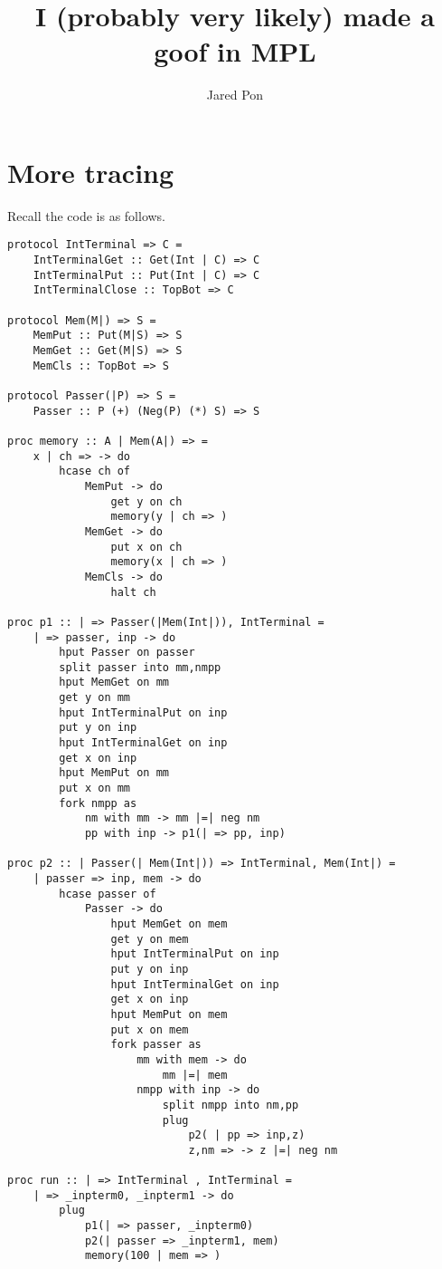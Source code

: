 \documentclass{article}
\title{I (probably very likely) made a goof in MPL}
\author{Jared Pon}
\theoremstyle{plain}%
\theoremstyle{definition}
\theoremstyle{remark}
\begin{document}
\maketitle 
\section{More tracing}
Recall the code is as follows.
\begin{verbatim}
protocol IntTerminal => C =
    IntTerminalGet :: Get(Int | C) => C
    IntTerminalPut :: Put(Int | C) => C
    IntTerminalClose :: TopBot => C

protocol Mem(M|) => S =
    MemPut :: Put(M|S) => S
    MemGet :: Get(M|S) => S
    MemCls :: TopBot => S

protocol Passer(|P) => S =
    Passer :: P (+) (Neg(P) (*) S) => S

proc memory :: A | Mem(A|) => =
    x | ch => -> do
        hcase ch of
            MemPut -> do
                get y on ch
                memory(y | ch => )
            MemGet -> do
                put x on ch
                memory(x | ch => )
            MemCls -> do
                halt ch

proc p1 :: | => Passer(|Mem(Int|)), IntTerminal = 
    | => passer, inp -> do
        hput Passer on passer
        split passer into mm,nmpp
        hput MemGet on mm 
        get y on mm
        hput IntTerminalPut on inp
        put y on inp
        hput IntTerminalGet on inp
        get x on inp
        hput MemPut on mm
        put x on mm
        fork nmpp as
            nm with mm -> mm |=| neg nm 
            pp with inp -> p1(| => pp, inp)

proc p2 :: | Passer(| Mem(Int|)) => IntTerminal, Mem(Int|) =
    | passer => inp, mem -> do
        hcase passer of
            Passer -> do
                hput MemGet on mem
                get y on mem
                hput IntTerminalPut on inp
                put y on inp
                hput IntTerminalGet on inp
                get x on inp
                hput MemPut on mem
                put x on mem
                fork passer as
                    mm with mem -> do
                        mm |=| mem
                    nmpp with inp -> do
                        split nmpp into nm,pp
                        plug
                            p2( | pp => inp,z)
                            z,nm => -> z |=| neg nm

proc run :: | => IntTerminal , IntTerminal =
    | => _inpterm0, _inpterm1 -> do
        plug 
            p1(| => passer, _inpterm0)
            p2(| passer => _inpterm1, mem)
            memory(100 | mem => )
\end{verbatim}
\end{document}
